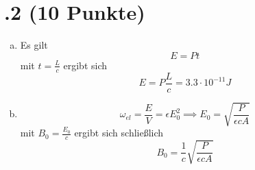 \section*{\nr.2 \tittwo (10 Punkte)}
\begin{enumerate}[(a)]
\item Es gilt
\begin{equation}
  E=Pt
\end{equation}
mit $t=\frac{L}{c}$ ergibt sich
\begin{equation}
  E=P \frac{L}{c}=3.3\cdot 10^{-11}J
\end{equation}
\item 
\begin{equation}
  \omega_{el}=\frac{E}{V}=\epsilon E_0^2\implies E_0=\sqrt{\frac{P}{\epsilon cA}}
\end{equation}
mit $B_0=\frac{E_0}{c}$ ergibt sich schließlich
\begin{equation}
  B_0 = \frac{1}{c}\sqrt{\frac{P}{\epsilon cA}}
\end{equation}
\end{enumerate}